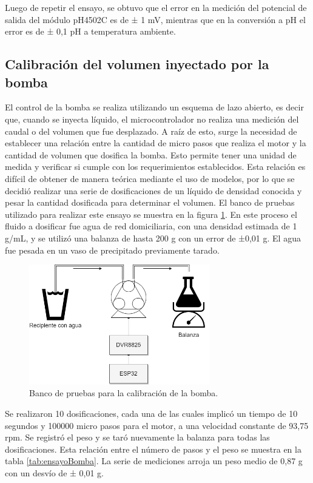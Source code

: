 Luego de repetir el ensayo, se obtuvo que el error en la medición del potencial de salida del módulo pH4502C es de ± 1 mV, mientras que en la conversión a pH el error es de ± 0,1 pH a temperatura ambiente. 

\subsection{Calibración del volumen inyectado por la bomba}

El control de la bomba se realiza utilizando un esquema de lazo abierto, es decir que, cuando se inyecta líquido, el microcontrolador  no realiza una medición del caudal o del volumen que fue desplazado. A raíz de esto, surge la necesidad de establecer una relación entre la cantidad de micro pasos que realiza el motor y la cantidad de volumen que dosifica la bomba. Esto permite tener una unidad de medida y verificar si cumple con los requerimientos establecidos. Esta relación es difícil de obtener de manera teórica mediante el uso de modelos, por lo que se decidió realizar una serie de dosificaciones de un líquido de densidad conocida y pesar la cantidad dosificada para determinar el volumen.
El banco de pruebas utilizado para realizar este ensayo se muestra en la figura \ref{fig:bancoPruebasBomba}. En este proceso el fluido a dosificar fue agua de red domiciliaria, con una densidad estimada de 1 g/mL, y se utilizó una balanza de hasta 200 g con un error de ±0,01 g. El agua fue pesada en un vaso de precipitado previamente tarado.

\begin{figure}[htbp]
	\centering
	\includegraphics[width=0.7\textwidth]{./Figures/bancoPruebasBomba.png}
	\caption{Banco de pruebas para la calibración de la bomba.}
	\label{fig:bancoPruebasBomba}
\end{figure}

Se realizaron 10 dosificaciones, cada una de las cuales implicó un tiempo de 10 segundos y 100000 micro pasos para el motor, a una velocidad constante de 93,75 rpm. Se registró el peso y se taró nuevamente la balanza para todas las dosificaciones. Esta relación entre el número de pasos y el peso se muestra en la tabla \ref{tab:ensayoBomba}. La serie de mediciones arroja un peso medio de 0,87 g con un desvío de ± 0,01 g.

